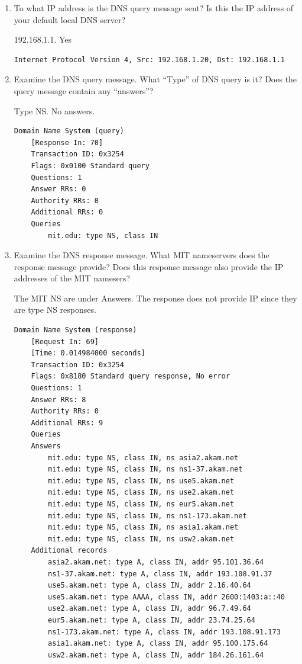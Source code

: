 \documentclass[letter,10pt]{article}
\begin{document}
\begin{enumerate}
\item To what IP address is the DNS query message sent? Is this the IP address of your
default local DNS server?

192.168.1.1. Yes

\begin{verbatim}
Internet Protocol Version 4, Src: 192.168.1.20, Dst: 192.168.1.1
\end{verbatim}

\item Examine the DNS query message. What “Type” of DNS query is it? Does the
query message contain any “answers”?

Type NS. No answers.

\begin{verbatim}
Domain Name System (query)
    [Response In: 70]
    Transaction ID: 0x3254
    Flags: 0x0100 Standard query
    Questions: 1
    Answer RRs: 0
    Authority RRs: 0
    Additional RRs: 0
    Queries
        mit.edu: type NS, class IN

\end{verbatim}

\item Examine the DNS response message. What MIT nameservers does the response
message provide? Does this response message also provide the IP addresses of the
MIT namesers?

The MIT NS are under Answers. The response does not provide IP since they are type NS responses.

\begin{verbatim}
Domain Name System (response)
    [Request In: 69]
    [Time: 0.014984000 seconds]
    Transaction ID: 0x3254
    Flags: 0x8180 Standard query response, No error
    Questions: 1
    Answer RRs: 8
    Authority RRs: 0
    Additional RRs: 9
    Queries
    Answers
        mit.edu: type NS, class IN, ns asia2.akam.net
        mit.edu: type NS, class IN, ns ns1-37.akam.net
        mit.edu: type NS, class IN, ns use5.akam.net
        mit.edu: type NS, class IN, ns use2.akam.net
        mit.edu: type NS, class IN, ns eur5.akam.net
        mit.edu: type NS, class IN, ns ns1-173.akam.net
        mit.edu: type NS, class IN, ns asia1.akam.net
        mit.edu: type NS, class IN, ns usw2.akam.net
    Additional records
        asia2.akam.net: type A, class IN, addr 95.101.36.64
        ns1-37.akam.net: type A, class IN, addr 193.108.91.37
        use5.akam.net: type A, class IN, addr 2.16.40.64
        use5.akam.net: type AAAA, class IN, addr 2600:1403:a::40
        use2.akam.net: type A, class IN, addr 96.7.49.64
        eur5.akam.net: type A, class IN, addr 23.74.25.64
        ns1-173.akam.net: type A, class IN, addr 193.108.91.173
        asia1.akam.net: type A, class IN, addr 95.100.175.64
        usw2.akam.net: type A, class IN, addr 184.26.161.64


\end{verbatim}
\end{enumerate}
\end{document}
